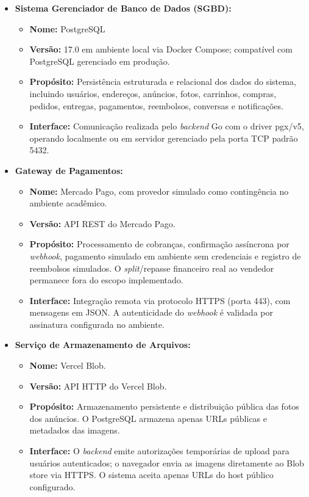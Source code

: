 \documentclass[
	article,			%
	11pt,				%
	oneside,			%
	a4paper,			%
	english,			%
	brazil,				%
	sumario=tradicional
	]{abntex2}
\begin{document}
\begin{itemize}
    \item \textbf{Sistema Gerenciador de Banco de Dados (SGBD):}
    \begin{itemize}
        \item[ ] \textbf{Nome:} PostgreSQL
        \item[ ] \textbf{Versão:} 17.0 em ambiente local via Docker Compose; compatível com PostgreSQL gerenciado em produção.
        \item[ ] \textbf{Propósito:} Persistência estruturada e relacional dos dados do sistema, incluindo usuários, endereços, anúncios, fotos, carrinhos, compras, pedidos, entregas, pagamentos, reembolsos, conversas e notificações.
        \item[ ] \textbf{Interface:} Comunicação realizada pelo \textit{backend} Go com o driver pgx/v5, operando localmente ou em servidor gerenciado pela porta TCP padrão 5432.
    \end{itemize}
    
    \vspace{0.5em}
    
    \item \textbf{Gateway de Pagamentos:}
    \begin{itemize}
        \item[ ] \textbf{Nome:} Mercado Pago, com provedor simulado como contingência no ambiente acadêmico.
        \item[ ] \textbf{Versão:} API REST do Mercado Pago.
        \item[ ] \textbf{Propósito:} Processamento de cobranças, confirmação assíncrona por \textit{webhook}, pagamento simulado em ambiente sem credenciais e registro de reembolsos simulados. O \textit{split}/repasse financeiro real ao vendedor permanece fora do escopo implementado.
        \item[ ] \textbf{Interface:} Integração remota via protocolo HTTPS (porta 443), com mensagens em JSON. A autenticidade do \textit{webhook} é validada por assinatura configurada no ambiente.
    \end{itemize}
    
    \vspace{0.5em}

    \item \textbf{Serviço de Armazenamento de Arquivos:}
    \begin{itemize}
        \item[ ] \textbf{Nome:} Vercel Blob.
        \item[ ] \textbf{Versão:} API HTTP do Vercel Blob.
        \item[ ] \textbf{Propósito:} Armazenamento persistente e distribuição pública das fotos dos anúncios. O PostgreSQL armazena apenas URLs públicas e metadados das imagens.
        \item[ ] \textbf{Interface:} O \textit{backend} emite autorizações temporárias de upload para usuários autenticados; o navegador envia as imagens diretamente ao Blob store via HTTPS. O sistema aceita apenas URLs do host público configurado.
    \end{itemize}


\end{itemize}
\end{document}
